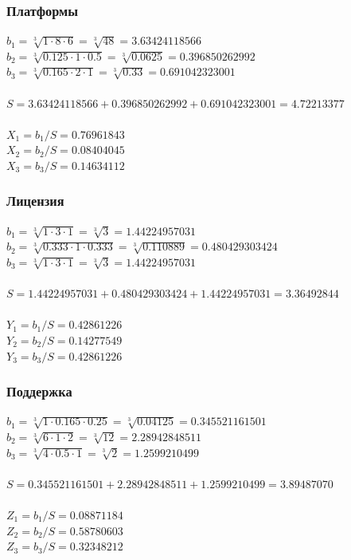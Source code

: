 \documentclass[a4paper,12pt]{report} %
\begin{document}
\subsubsection{Платформы}
$ b_1=\sqrt[3]{1 \cdot 8 \cdot 6} = \sqrt[3]{48} = 3.63424118566 $ \\
$ b_2=\sqrt[3]{0.125 \cdot 1 \cdot 0.5} = \sqrt[3]{0.0625} = 0.396850262992 $ \\
$ b_3=\sqrt[3]{0.165 \cdot 2 \cdot 1} = \sqrt[3]{0.33} = 0.691042323001 $ \\
\\
$ S = 3.63424118566 + 0.396850262992 + 0.691042323001 = 4.72213377 $ \\
\\
$ X_1 = b_1/S = 0.76961843 $ \\
$ X_2 = b_2/S = 0.08404045 $ \\
$ X_3 = b_3/S = 0.14634112 $ \\

\subsubsection{Лицензия}
$ b_1=\sqrt[3]{1 \cdot 3 \cdot 1} = \sqrt[3]{3} = 1.44224957031 $ \\
$ b_2=\sqrt[3]{0.333 \cdot 1 \cdot 0.333} = \sqrt[3]{0.110889} = 0.480429303424
$ \\
$ b_3=\sqrt[3]{1 \cdot 3 \cdot 1} = \sqrt[3]{3} = 1.44224957031 $ \\
\\
$ S = 1.44224957031 + 0.480429303424 + 1.44224957031 = 3.36492844 $ \\
\\
$ Y_1 = b_1/S = 0.42861226 $ \\
$ Y_2 = b_2/S = 0.14277549 $ \\
$ Y_3 = b_3/S = 0.42861226 $ \\

\subsubsection{Поддержка}
$ b_1=\sqrt[3]{1 \cdot 0.165 \cdot 0.25} = \sqrt[3]{0.04125} = 0.345521161501 $ \\
$ b_2=\sqrt[3]{6 \cdot 1 \cdot 2} = \sqrt[3]{12} = 2.28942848511 $ \\
$ b_3=\sqrt[3]{4 \cdot 0.5 \cdot 1} = \sqrt[3]{2} = 1.2599210499 $ \\
\\
$ S = 0.345521161501 + 2.28942848511 + 1.2599210499 = 3.89487070 $ \\
\\
$ Z_1 = b_1/S = 0.08871184 $ \\
$ Z_2 = b_2/S = 0.58780603 $ \\
$ Z_3 = b_3/S = 0.32348212 $ \\
\end{document}
